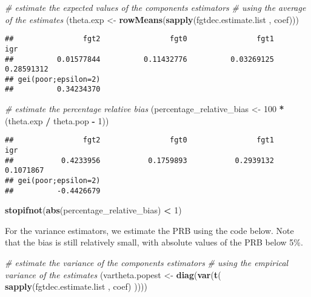 \documentclass[
]{book}
\newenvironment{Shaded}{\begin{snugshade}}{\end{snugshade}}
\newcommand{\CommentTok}[1]{\textcolor[rgb]{0.56,0.35,0.01}{\textit{#1}}}
\newcommand{\DecValTok}[1]{\textcolor[rgb]{0.00,0.00,0.81}{#1}}
\newcommand{\FunctionTok}[1]{\textcolor[rgb]{0.13,0.29,0.53}{\textbf{#1}}}
\newcommand{\NormalTok}[1]{#1}
\newcommand{\OtherTok}[1]{\textcolor[rgb]{0.56,0.35,0.01}{#1}}
\newcommand{\SpecialCharTok}[1]{\textcolor[rgb]{0.81,0.36,0.00}{\textbf{#1}}}
\begin{document}
\begin{Shaded}
\begin{Highlighting}[]
\CommentTok{\# estimate the expected values of the components estimators}
\CommentTok{\# using the average of the estimates}
\NormalTok{(theta.exp }\OtherTok{\textless{}{-}} \FunctionTok{rowMeans}\NormalTok{(}\FunctionTok{sapply}\NormalTok{(fgtdec.estimate.list , coef)))}
\end{Highlighting}
\end{Shaded}

\begin{verbatim}
##                fgt2                fgt0                fgt1                 igr 
##          0.01577844          0.11432776          0.03269125          0.28591312 
## gei(poor;epsilon=2) 
##          0.34234370
\end{verbatim}

\begin{Shaded}
\begin{Highlighting}[]
\CommentTok{\# estimate the percentage relative bias}
\NormalTok{(percentage\_relative\_bias }\OtherTok{\textless{}{-}} \DecValTok{100} \SpecialCharTok{*}\NormalTok{ (theta.exp }\SpecialCharTok{/}\NormalTok{ theta.pop }\SpecialCharTok{{-}} \DecValTok{1}\NormalTok{))}
\end{Highlighting}
\end{Shaded}

\begin{verbatim}
##                fgt2                fgt0                fgt1                 igr 
##           0.4233956           0.1759893           0.2939132           0.1071867 
## gei(poor;epsilon=2) 
##          -0.4426679
\end{verbatim}

\begin{Shaded}
\begin{Highlighting}[]
\FunctionTok{stopifnot}\NormalTok{(}\FunctionTok{abs}\NormalTok{(percentage\_relative\_bias) }\SpecialCharTok{\textless{}} \DecValTok{1}\NormalTok{) }
\end{Highlighting}
\end{Shaded}

For the variance estimators, we estimate the PRB using the code below.
Note that the bias is still relatively small, with absolute values of the PRB below 5\%.

\begin{Shaded}
\begin{Highlighting}[]
\CommentTok{\# estimate the variance of the components estimators}
\CommentTok{\# using the empirical variance of the estimates}
\NormalTok{(vartheta.popest }\OtherTok{\textless{}{-}}
   \FunctionTok{diag}\NormalTok{(}\FunctionTok{var}\NormalTok{(}\FunctionTok{t}\NormalTok{(}
     \FunctionTok{sapply}\NormalTok{(fgtdec.estimate.list , coef)}
\NormalTok{   ))))}
\end{Highlighting}
\end{Shaded}
\end{document}
